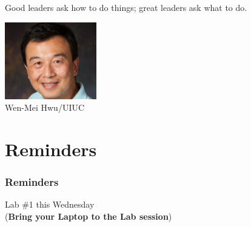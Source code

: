 \documentclass[11pt]{beamer}
\begin{document}
\begin{frame}
	\frametitle{}
	\Enlarge
	\vspace{5mm}
	Good leaders ask how to do things; great leaders ask what to do.
	
	\vspace{2mm}
	\hfill \includegraphics[width=0.3\textwidth]{./img/wenmei.png} \hspace{10mm} \\
	\small \hfill Wen-Mei Hwu/UIUC\\
\end{frame}

\section{Reminders}

\begin{frame}[plain,c]
  \frametitle{Reminders}
  \Enlarge

  \begin{center}
    {\Huge Lab \#1 this Wednesday}\\ \vspace{2mm}
    \textcolor{\CSBase}{({\bf Bring your Laptop to the Lab session})}
  \end{center}
\end{frame}
\end{document}
